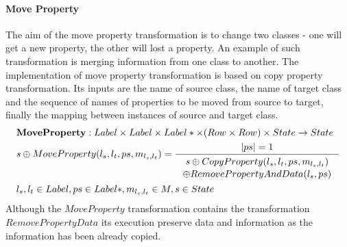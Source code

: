\documentclass[11pt]{article}
\begin{document}
\paragraph{Move Property}
The aim of the move property transformation is to change two classes - one will get a new property, the other will lost a property. An example of such transformation is merging information from one class to another. The implementation of move property transformation is based on copy property transformation. Its inputs are the name of source class, the name of target class and the sequence of names of properties to be moved from source to target, finally the mapping between instances of source and target class.
\begin{align*}
&	\mathbf{MoveProperty} : Label \times Label \times Label* \times (Row \times Row) \times State \rightarrow State \\
&	s \oplus MoveProperty(l_s, l_t, ps, m_{l_s, l_t}) =
 	\inference{|ps| = 1 }{\begin{gathered} s \oplus CopyProperty(l_s, l_t, ps, m_{l_s, l_t}) \\ \oplus RemovePropertyAndData(l_s, ps)
\end{gathered}}
	\\
&	l_s, l_t \in Label, ps \in Label*,  m_{l_s, l_t} \in M, s \in State
\end{align*}
Although the $MoveProperty$ transformation contains the transformation $RemovePropertyData$ its execution preserve data and information as the information has been already copied. 
\end{document}
